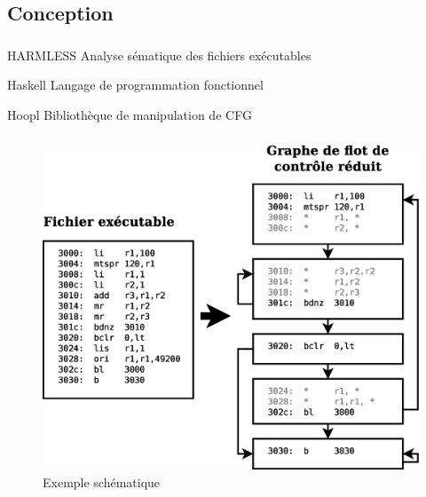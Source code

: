 \documentclass{beamer}
\begin{document}
  \subsection{Conception}
  \begin{frame}
    \frametitle{\secname}
    \framesubtitle{\subsecname}
    \small
    \begin{block}{HARMLESS}
      Analyse sématique des fichiers exécutables \\
      \tiny
    \end{block}

    \begin{block}{Haskell}
      Langage de programmation fonctionnel \\
      \tiny
    \end{block}

    \begin{block}{Hoopl}
      Bibliothèque de manipulation de CFG \\
      \tiny
    \end{block}

  \end{frame}

  \begin{frame}
    \frametitle{\secname}

    \begin{figure}
      \centering
      \includegraphics[scale=.3]{cfg.eps}
      \caption{Exemple schématique}
    \end{figure}
  \end{frame}
\end{document}

